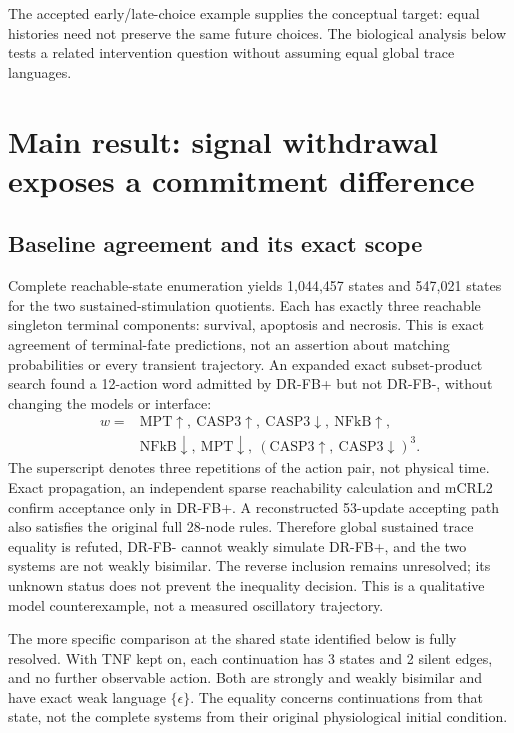 \documentclass{ws-jbcb}
\numberwithin{equation}{section}
\newcommand{\DRBaseMinusStates}{547{,}021}
\newcommand{\DRBasePlusStates}{1{,}044{,}457}
\newcommand{\DRLocalBaseEdges}{2}
\newcommand{\DRLocalBaseStates}{3}
\begin{document}
The accepted early/late-choice example supplies the conceptual target: equal histories need not preserve the same future choices. The biological analysis below tests a related intervention question without assuming equal global trace languages.

\section{Main result: signal withdrawal exposes a commitment difference}
\label{sec:death-results}

\subsection{Baseline agreement and its exact scope}

Complete reachable-state enumeration yields \DRBasePlusStates{} states and
\DRBaseMinusStates{} states for the two sustained-stimulation quotients.
Each has exactly three reachable singleton terminal components: survival,
apoptosis and necrosis. This is exact agreement of terminal-fate predictions,
not an assertion about matching probabilities or every transient trajectory.
An expanded exact subset-product search found a 12-action word admitted by
DR-FB+ but not DR-FB-, without changing the models or interface:
\[
\begin{split}
w={}&\mathrm{MPT}\!\uparrow,\ \mathrm{CASP3}\!\uparrow,\
\mathrm{CASP3}\!\downarrow,\ \mathrm{NFkB}\!\uparrow,\\
&\mathrm{NFkB}\!\downarrow,\ \mathrm{MPT}\!\downarrow,\
(\mathrm{CASP3}\!\uparrow,\ \mathrm{CASP3}\!\downarrow)^3 .
\end{split}
\]
The superscript denotes three repetitions of the action pair, not physical
time. Exact propagation, an independent sparse reachability calculation and
mCRL2 confirm acceptance only in DR-FB+. A reconstructed 53-update accepting
path also satisfies the original full 28-node rules. Therefore global
sustained trace equality is refuted, DR-FB- cannot weakly simulate DR-FB+,
and the two systems are not weakly bisimilar. The reverse inclusion remains unresolved;
its unknown status does not prevent the inequality decision. This is a
qualitative model counterexample, not a measured oscillatory trajectory.

The more specific comparison at the shared state identified below is fully
resolved. With TNF kept on, each continuation has \DRLocalBaseStates{} states
and \DRLocalBaseEdges{} silent edges, and no further observable action.
Both are strongly and weakly bisimilar and have exact weak language
$\{\epsilon\}$. The equality concerns continuations from that state, not
the complete systems from their original physiological initial condition.
\end{document}
